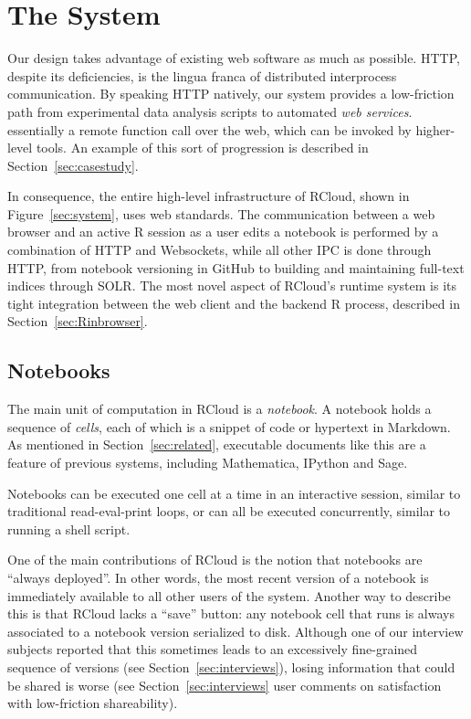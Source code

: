\section{The System\label{sec:system}}

Our design takes advantage of existing web software as much as possible.
HTTP, despite its deficiencies, is the lingua franca of distributed
interprocess communication. By speaking HTTP natively, our system
provides a low-friction path from experimental data analysis scripts
to automated \emph{web services}. 
essentially a remote function call over
the web, which can be invoked by higher-level tools. An example of
this sort of progression is described in Section~\ref{sec:casestudy}.

In consequence, the entire high-level infrastructure of RCloud, shown
in Figure~\ref{sec:system}, uses web standards. The communication between
a web browser and an active R session as a user edits a notebook is
performed by a combination of HTTP and Websockets, while all other IPC
is done through HTTP, from notebook versioning in GitHub to building and
maintaining full-text indices through SOLR. The most novel aspect
of RCloud's runtime system is its tight integration between the web client
and the backend R process, described in Section~\ref{sec:Rinbrowser}.

\subsection{Notebooks\label{sec:notebooks}}

The main unit of computation in RCloud is a \emph{notebook}.  A
notebook holds a sequence of \emph{cells}, each of which is a snippet
of code or hypertext in Markdown. As mentioned in
Section~\ref{sec:related}, executable documents like
this are a feature of previous systems, including Mathematica,
IPython and Sage.

Notebooks can be executed one cell at a time in an interactive
session, similar to traditional read-eval-print
loops, or can all be executed concurrently,
similar to running a shell script.

One of the main contributions of RCloud is the notion that notebooks are
``always deployed''. In other words, the most recent version of a
notebook is immediately available to all other users of the system.
Another way to describe this is that
RCloud lacks a ``save'' button: any notebook cell that runs is always
associated to a notebook version serialized to disk. Although one of
our interview subjects reported that this sometimes leads to an
excessively fine-grained sequence of versions (see
Section~\ref{sec:interviews}), 
losing information that could be shared is worse (see
Section~\ref{sec:interviews} user comments on
satisfaction with low-friction shareability).

